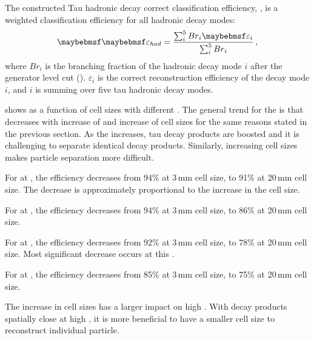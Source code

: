 The constructed  Tau hadronic decay correct classification efficiency, \tauHad, is a weighted classification efficiency for all hadronic decay modes:
\begin{equation}
\label{eq:had}
\tauHad = \frac{\sum_{i}^5 {Br}_{i}\varepsilon_{i}}{\sum_{i}^5 {Br}_{i}}  \,,
\end{equation}
where $Br_{i}$ is the branching fraction of the hadronic decay mode $i$  after the generator level cut (). $\varepsilon_{i}$ is the correct reconstruction efficiency of the decay mode $i$, and $i$ is summing over five tau hadronic decay modes.

 shows \tauHad as a function of \ECAL cell sizes with different \sqrtS. The general trend for the \tauHad is that \tauHad decreases with increase of \sqrtS and increase of \ECAL cell sizes for the same reasons stated in the previous section. As the \sqrtS increases, tau decay products are boosted and it is challenging to separate identical decay products. Similarly,  increasing \ECAL cell sizes makes particle separation more difficult.

For \tauHad at , the efficiency decreases from 94\% at 3\,mm cell size, to 91\% at 20\,mm cell size. The decrease is approximately proportional to the increase in the cell size.

For \tauHad at , the efficiency decreases from 94\% at 3\,mm cell size, to 86\% at 20\,mm cell size.

For \tauHad at , the efficiency decreases from 92\% at 3\,mm cell size, to 78\% at 20\,mm cell size. Most significant decrease occurs at this \sqrtS.

For \tauHad at , the efficiency decreases from 85\% at 3\,mm cell size, to 75\% at 20\,mm cell size.

The increase in \ECAL cell sizes has a larger impact on high \sqrtS. With decay products spatially close at high \sqrtS, it is more beneficial to have a smaller \ECAL cell size to reconstruct individual particle.


